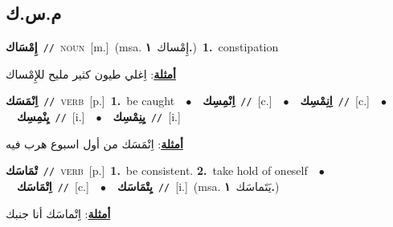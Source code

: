 \documentclass[10pt,a4paper,twoside]{article} %
\begin{document}
\begin{multicols}{2}
\vspace{-3mm}
\subsection*{\color{blue}\foreignlanguage{arabic}{م.س.ك}\color{blue}{}} 

{\setlength\topsep{0pt}\textbf{\foreignlanguage{arabic}{إِمْسَاك}}\ {\color{gray}\texttt{//}\color{black}}\ \textsc{noun}\ [m.]\ \color{gray}(msa. \foreignlanguage{arabic}{إِمْساك}~\foreignlanguage{arabic}{\textbf{١.}})\color{black}\ \textbf{1.}~constipation\  \begin{flushright}\color{gray}\foreignlanguage{arabic}{\textbf{\underline{\foreignlanguage{arabic}{أمثلة}}}: اِغلي طيون كثير مليح للإِمْساك}\end{flushright}\color{black}} \vspace{2mm}

{\setlength\topsep{0pt}\textbf{\foreignlanguage{arabic}{اِنْمَسَك}}\ {\color{gray}\texttt{//}\color{black}}\ \textsc{verb}\ [p.]\ \textbf{1.}~be caught\ \ $\bullet$\ \ \setlength\topsep{0pt}\textbf{\foreignlanguage{arabic}{اِنْمِسِك}}\ {\color{gray}\texttt{//}\color{black}}\ [c.]\ \ $\bullet$\ \ \setlength\topsep{0pt}\textbf{\foreignlanguage{arabic}{اِنِمْسِك}}\ {\color{gray}\texttt{//}\color{black}}\ [c.]\ \ $\bullet$\ \ \setlength\topsep{0pt}\textbf{\foreignlanguage{arabic}{يِنْمِسِك}}\ {\color{gray}\texttt{//}\color{black}}\ [i.]\ \ $\bullet$\ \ \setlength\topsep{0pt}\textbf{\foreignlanguage{arabic}{يِنِمْسِك}}\ {\color{gray}\texttt{//}\color{black}}\ [i.]\  \begin{flushright}\color{gray}\foreignlanguage{arabic}{\textbf{\underline{\foreignlanguage{arabic}{أمثلة}}}: اِنْمَسَك من أول اسبوع هرب فيه}\end{flushright}\color{black}} \vspace{2mm}

{\setlength\topsep{0pt}\textbf{\foreignlanguage{arabic}{تْمَاسَك}}\ {\color{gray}\texttt{//}\color{black}}\ \textsc{verb}\ [p.]\ \textbf{1.}~be consistent.  \textbf{2.}~take hold of oneself\ \ $\bullet$\ \ \setlength\topsep{0pt}\textbf{\foreignlanguage{arabic}{اِتْمَاسَك}}\ {\color{gray}\texttt{//}\color{black}}\ [c.]\ \ $\bullet$\ \ \setlength\topsep{0pt}\textbf{\foreignlanguage{arabic}{يِتْمَاسَك}}\ {\color{gray}\texttt{//}\color{black}}\ [i.]\ \color{gray}(msa. \foreignlanguage{arabic}{يَتَماسَك}~\foreignlanguage{arabic}{\textbf{١.}})\color{black}\  \begin{flushright}\color{gray}\foreignlanguage{arabic}{\textbf{\underline{\foreignlanguage{arabic}{أمثلة}}}: اِتْماسَك أنا جنبك}\end{flushright}\color{black}} \vspace{2mm}


\end{multicols}
\end{document}
